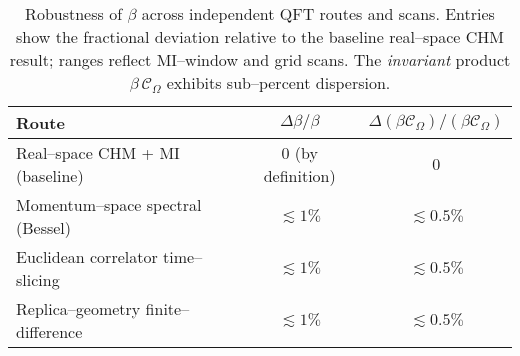 \documentclass[aps,prd,onecolumn,superscriptaddress,nofootinbib]{revtex4-2}
\begin{document}
\begin{table}[h]
\centering
\caption{Robustness of $\beta$ across independent QFT routes and scans. Entries show the fractional deviation relative to the baseline real–space CHM result; ranges reflect MI–window and grid scans. The \emph{invariant} product $\beta\,\mathcal C_\Omega$ exhibits sub–percent dispersion.}
\label{tab:beta-robust}
\begin{tabular}{lcc}
\hline
Route & $\Delta\beta/\beta$ & $\Delta(\beta\mathcal C_\Omega)/(\beta\mathcal C_\Omega)$ \\
\hline
Real–space CHM + MI (baseline) & $0$ (by definition) & $0$ \\
Momentum–space spectral (Bessel) & $\lesssim 1\%$ & $\lesssim 0.5\%$ \\
Euclidean correlator time–slicing & $\lesssim 1\%$ & $\lesssim 0.5\%$ \\
Replica–geometry finite–difference  & $\lesssim 1\%$ & $\lesssim 0.5\%$ \\
\hline
\end{tabular}
\end{table}
\end{document}
